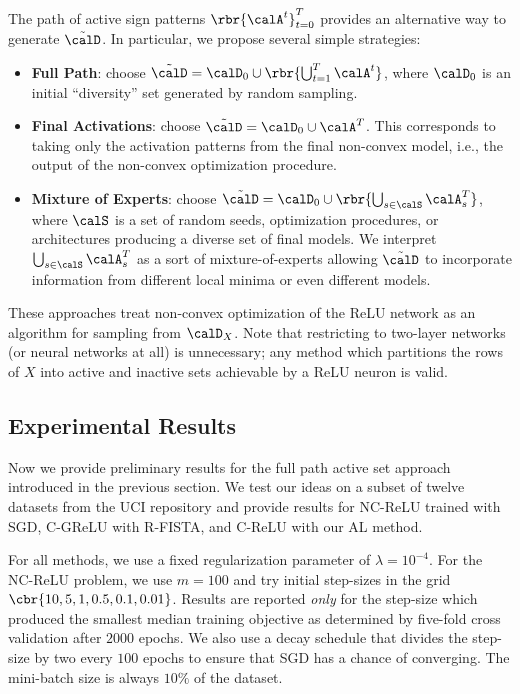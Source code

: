 The path of active sign patterns \( \rbr{\calA^t}_{t=0}^T \) provides an alternative way to generate \( \tilde \calD \).
In particular, we propose several simple strategies:
\begin{itemize}
	\item \textbf{Full Path}: choose \( \tilde \calD = \calD_0 \cup \rbr{\bigcup_{t=1}^T \calA^t} \), where \( \calD_0 \) is an initial ``diversity'' set generated by random sampling.
	\item \textbf{Final Activations}: choose  \( \tilde \calD = \calD_0 \cup \calA^T \).
	      This corresponds to taking only the activation patterns from the final non-convex model, i.e., the output of the non-convex optimization procedure.
	\item \textbf{Mixture of Experts}: choose  \( \tilde \calD = \calD_0 \cup \rbr{\bigcup_{s \in \calS} \calA_s^T} \), where \( \calS \) is a set of random seeds, optimization procedures, or architectures producing a diverse set of final models.
	      We interpret \( \bigcup_{s \in \calS} \calA_s^T \) as a sort of mixture-of-experts allowing \( \tilde \calD \) to incorporate information from different local minima or even different models.
\end{itemize}
These approaches treat non-convex optimization of the ReLU network as an algorithm for sampling from \( \calD_X \).
Note that restricting to two-layer networks (or neural networks at all) is unnecessary;
any method which partitions the rows of \( X \) into active and inactive sets achievable by a ReLU neuron is valid.

\subsection{Experimental Results}



Now we provide preliminary results for the full path active set approach introduced in the previous section.
We test our ideas on a subset of twelve datasets from the UCI repository and provide results for NC-ReLU trained with SGD, C-GReLU with R-FISTA, and C-ReLU with our AL method.

For all methods, we use a fixed regularization parameter of \( \lambda = 10^{-4} \).
For the NC-ReLU problem, we use \( m = 100 \) and try initial step-sizes in the grid \( \cbr{10, 5, 1, 0.5, 0.1, 0.01} \).
Results are reported \emph{only} for the step-size which produced the smallest median training objective as determined by five-fold cross validation after \( 2000 \) epochs.
We also use a decay schedule that divides the step-size by two every \( 100 \) epochs to ensure that SGD has a chance of converging.
The mini-batch size is always \( 10\% \) of the dataset.

